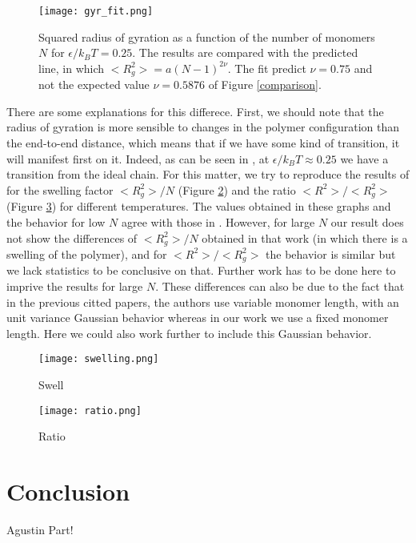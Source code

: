 \documentclass[aps,prl,reprint,groupedaddress]{revtex4-1}
\begin{document}
\begin{figure}[ht]
	\texttt{[image: gyr\_fit.png]}
	\caption{Squared radius of gyration as a function of the number of monomers $N$ for $\epsilon/k_B T = 0.25$. The results are compared with the predicted line, in which $<R_g^2> = a(N-1)^{2 \nu}$. The fit predict $\nu = 0.75$ and not the expected value $\nu = 0.5876$ of Figure \ref{comparison}. \label{gyr_fit}}
\end{figure}

There are some explanations for this differece. First, we should note that the radius of gyration is more sensible to changes in the polymer configuration than the end-to-end distance, which means that if we have some kind of transition, it will manifest first on it. Indeed, as can be seen in \cite{Witt1996}, at $\epsilon/k_B T \approx 0.25$ we have a transition from the ideal chain. For this matter, we try to reproduce the results of \cite{Grassberger1997} for the swelling factor $<R_g^2>/N$ (Figure \ref{swell}) and the ratio $<R^2>/<R_g^2>$ (Figure \ref{ratio}) for different temperatures. The values obtained in these graphs and the behavior for low $N$ agree with those in \cite{Grassberger1997}. However, for large $N$ our result does not show the differences of $<R_g^2>/N$ obtained in that work (in which there is a swelling of the polymer), and for $<R^2>/<R_g^2>$ the behavior is similar but we lack statistics to be conclusive on that. Further work has to be done here to imprive the results for large $N$. These differences can also be due to the fact that in the previous citted papers, the authors use variable monomer length, with an unit variance Gaussian behavior whereas in our work we use a fixed monomer length. Here we could also work further to include this Gaussian behavior. 

\begin{figure}[ht]
	\texttt{[image: swelling.png]}
	\caption{Swell \label{swell}}
\end{figure}

\begin{figure}[ht]
	\texttt{[image: ratio.png]}
	\caption{Ratio \label{ratio}}
\end{figure}

\section{Conclusion \label{conclusion}}
Agustin Part!


\end{document}
